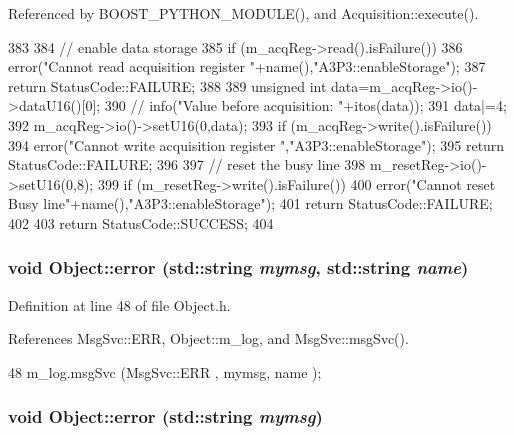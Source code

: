 Referenced by BOOST\_\-PYTHON\_\-MODULE(), and Acquisition::execute().


\begin{DoxyCode}
383                               {
384   // enable data storage
385   if (m_acqReg->read().isFailure()){
386     error("Cannot read acquisition register "+name(),"A3P3::enableStorage");
387     return StatusCode::FAILURE;
388   }
389   unsigned int data=m_acqReg->io()->dataU16()[0];
390   //  info("Value before acquisition: "+itos(data));
391   data|=4;
392   m_acqReg->io()->setU16(0,data);
393   if (m_acqReg->write().isFailure()){
394     error("Cannot write acquisition register ","A3P3::enableStorage");
395     return StatusCode::FAILURE;
396   }
397   // reset the busy line
398   m_resetReg->io()->setU16(0,8);
399   if (m_resetReg->write().isFailure()){
400     error("Cannot reset Busy line"+name(),"A3P3::enableStorage");
401     return StatusCode::FAILURE;
402   }
403   return StatusCode::SUCCESS;
404 }
\end{DoxyCode}
\hypertarget{classObject_ad7f6c457733082efa2f9ff5f5c8e119a}{
\subsubsection[{error}]{\setlength{\rightskip}{0pt plus 5cm}void Object::error (std::string {\em mymsg}, \/  std::string {\em name})}}
\label{classObject_ad7f6c457733082efa2f9ff5f5c8e119a}


Definition at line 48 of file Object.h.

References MsgSvc::ERR, Object::m\_\-log, and MsgSvc::msgSvc().


\begin{DoxyCode}
48 { m_log.msgSvc (MsgSvc::ERR     , mymsg, name ); }
\end{DoxyCode}
\hypertarget{classObject_a204a95f57818c0f811933917a30eff45}{
\subsubsection[{error}]{\setlength{\rightskip}{0pt plus 5cm}void Object::error (std::string {\em mymsg})}}
\label{classObject_a204a95f57818c0f811933917a30eff45}


